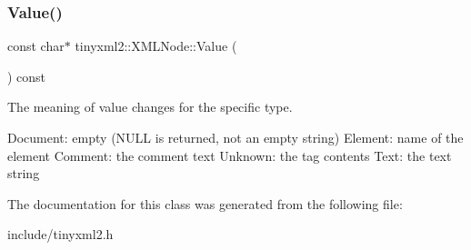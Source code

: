 \mbox{\label{classtinyxml2_1_1XMLNode_a66344989a4b436155bcda72bd6b07b82}} 
\subsubsection{\texorpdfstring{Value()}{Value()}}
{\footnotesize\ttfamily const char$\ast$ tinyxml2\+::\+X\+M\+L\+Node\+::\+Value (\begin{DoxyParamCaption}{ }\end{DoxyParamCaption}) const}

The meaning of \textquotesingle{}value\textquotesingle{} changes for the specific type. \begin{DoxyVerb}Document:   empty (NULL is returned, not an empty string)
Element:    name of the element
Comment:    the comment text
Unknown:    the tag contents
Text:       the text string
\end{DoxyVerb}
 

The documentation for this class was generated from the following file\+:\begin{DoxyCompactItemize}
\item 
include/tinyxml2.\+h\end{DoxyCompactItemize}
